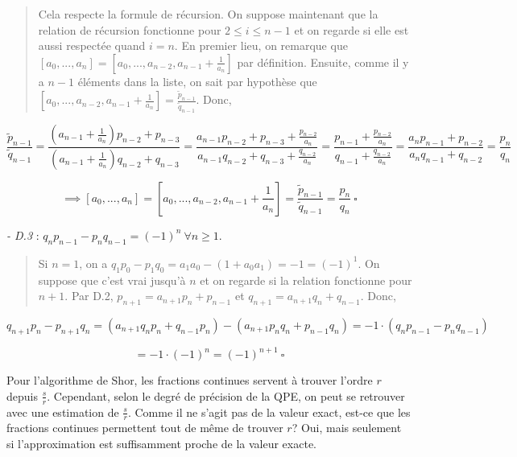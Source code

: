 \begin{quote}
    Cela respecte la formule de récursion. On suppose maintenant que la relation de récursion fonctionne pour $2 \leq i \leq n-1$ et on regarde si elle est aussi respectée quand $i = n$. En premier lieu, on remarque que $[a_0, ..., a_n] = [a_0, ..., a_{n-2}, a_{n-1} + \frac{1}{a_n}]$ par définition. Ensuite, comme il y a $n-1$ éléments dans la liste, on sait par hypothèse que $[a_0, ..., a_{n-2}, a_{n-1} + \frac{1}{a_n}] = \frac{\tilde{p}_{n-1}}{\tilde{q}_{n-1}}$. Donc,
\end{quote}

\begin{equation*}
    \frac{\tilde{p}_{n-1}}{\tilde{q}_{n-1}} = \frac{(a_{n-1} + \frac{1}{a_n})p_{n-2} + p_{n-3}}{(a_{n-1} + \frac{1}{a_n})q_{n-2} + q_{n-3}} = \frac{a_{n-1}p_{n-2} + p_{n-3} + \frac{p_{n-2}}{a_n}}{a_{n-1}q_{n-2} + q_{n-3} + \frac{q_{n-2}}{a_n}} = \frac{p_{n-1} + \frac{p_{n-2}}{a_n}}{q_{n-1} + \frac{q_{n-2}}{a_n}} = \frac{a_np_{n-1} + p_{n-2}}{a_nq_{n-1} + q_{n-2}} = \frac{p_n}{q_n}
\end{equation*}

\begin{equation*}
    \implies [a_0, ..., a_n] = [a_0, ..., a_{n-2}, a_{n-1} + \frac{1}{a_n}] = \frac{\tilde{p}_{n-1}}{\tilde{q}_{n-1}} = \frac{p_n}{q_n} \ \square
\end{equation*}

\textit{- D.3} : $q_np_{n-1} - p_nq_{n-1} = (-1)^n \ \forall n \geq 1$.

\begin{quote}
    Si $n=1$, on a $q_1p_0 - p_1q_0 = a_1a_0 - (1 + a_0a_1) = -1 = (-1)^1$. On suppose que c'est vrai jusqu'à $n$ et on regarde si la relation fonctionne pour $n+1$. Par D.2, $p_{n+1} = a_{n+1}p_n + p_{n-1}$ et $q_{n+1} = a_{n+1}q_n + q_{n-1}$. Donc,
\end{quote}
\begin{equation*}
    q_{n+1}p_n - p_{n+1}q_n = (a_{n+1}q_np_n + q_{n-1}p_n) - (a_{n+1}p_nq_n + p_{n-1}q_n) = -1 \cdot (q_np_{n-1} - p_nq_{n-1}) 
\end{equation*}

\begin{equation*}
    = -1 \cdot (-1)^n = (-1)^{n+1} \ \square 
\end{equation*}

Pour l'algorithme de Shor, les fractions continues servent à trouver l'ordre $r$ depuis $\frac{s}{r}$. Cependant, selon le degré de précision de la QPE, on peut se retrouver avec une estimation de $\frac{s}{r}$. Comme il ne s'agit pas de la valeur exact, est-ce que les fractions continues permettent tout de même de trouver $r$? Oui, mais seulement si l'approximation est suffisamment proche de la valeur exacte.

